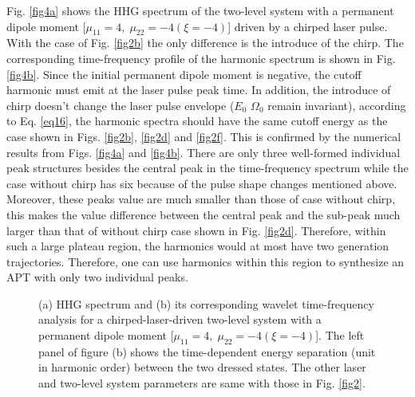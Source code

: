 \documentclass[10pt,letterpaper]{article}
\begin{document}
Fig. \ref{fig4a} shows the HHG spectrum of the two-level system with a permanent dipole moment [$\mu_{11}=4,\;\mu_{22}=-4(\xi=-4)$] driven by a chirped laser pulse. With the case of Fig. \ref{fig2b} the only difference is the introduce of the chirp. The corresponding time-frequency profile of the harmonic spectrum is shown in Fig. \ref{fig4b}. Since the initial permanent dipole moment is negative, the cutoff harmonic must emit at the laser pulse peak time. In addition, the introduce of chirp doesn't change the laser pulse envelope ($E_{0}$ $\Omega_0$ remain invariant), according to Eq. \ref{eq16}, the harmonic spectra should have the same cutoff energy as the case shown in Figs. \ref{fig2b}, \ref{fig2d} and \ref{fig2f}. This is confirmed by the numerical results from Figs. \ref{fig4a} and \ref{fig4b}. There are only three well-formed individual peak structures besides the central peak in the time-frequency spectrum while the case without chirp has six because of the pulse shape changes mentioned above. Moreover, these peaks value are much smaller than those of case without chirp, this makes the value difference between the central peak and the sub-peak much larger than that of without chirp case shown in Fig. \ref{fig2d}. Therefore, within such a large plateau region, the harmonics would at most have two generation trajectories. Therefore, one can use harmonics within this region to synthesize an APT with only two individual peaks. 
\begin{figure}[!htbp]
	\centering
	\caption{(a) HHG spectrum and (b) its corresponding wavelet time-frequency analysis for a chirped-laser-driven two-level system with a permanent dipole moment [$\mu_{11}=4,\;\mu_{22}=-4(\xi=-4)$]. The left panel of figure (b) shows the time-dependent energy separation (unit in harmonic order) between the two dressed states. The other laser and two-level system parameters are same with those in Fig. \ref{fig2}.}
	\label{fig4}
\end{figure}
\end{document}
